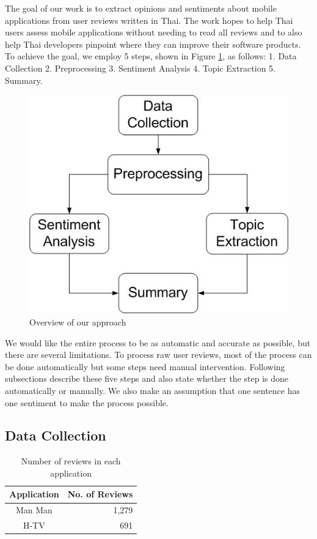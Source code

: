
The goal of our work is to extract opinions and sentiments about mobile applications from user reviews written in Thai. The work hopes to help Thai users assess mobile applications without needing to read all reviews and to also help Thai developers pinpoint where they can improve their software products. To achieve the goal, we employ 5 steps, shown in Figure \ref{fig:approachFig}, as follows: 1. Data Collection 2. Preprocessing 3. Sentiment Analysis 4. Topic Extraction 5. Summary. 

\begin{figure}[t]
	\centering
	\includegraphics[width=.5\linewidth]{Process.jpg}
	\caption{Overview of our approach}
	\label{fig:approachFig}
\end{figure}

We would like the entire process to be as automatic and accurate as possible, but there are several limitations. To process raw user reviews, most of the process can be done automatically but some steps need manual intervention. Following subsections describe these five steps and also state whether the step is done automatically or manually. We also make an assumption that one sentence has one sentiment to make the process possible. 

\subsection{Data Collection}

\begin{table}[h]
	\caption{Number of reviews in each application}
	\label{table:NoOfReview}
	\centering
	\begin{tabular}{|c|r|}
		\hline
		\textbf{Application} & \multicolumn{1}{|c|}{\textbf{No. of Reviews}} \\
		\hline
		Man Man & 1,279\\
		\hline
		H-TV & 691\\
		\hline
	\end{tabular}
\end{table}

